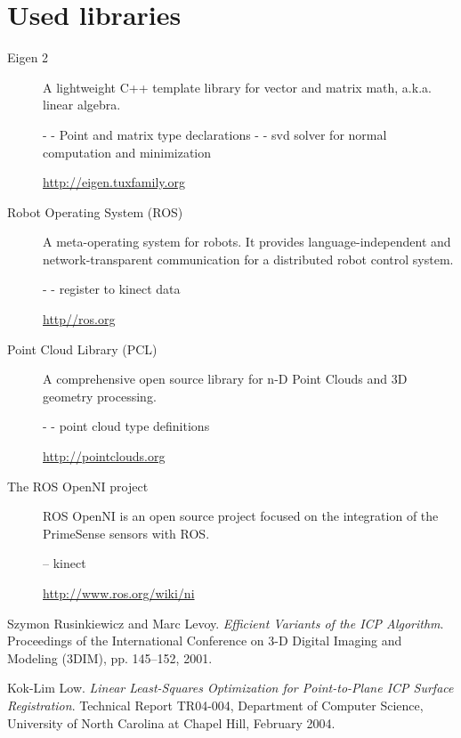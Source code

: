 \documentclass[twocolumn]{article}
\begin{document}
\section{Used libraries}
\begin{description}
\item[Eigen 2]
A lightweight C++ template library for vector and matrix math,
a.k.a. linear algebra.

- - Point and matrix type declarations
- - svd solver for normal computation and minimization

\href{http://eigen.tuxfamily.org}{http://eigen.tuxfamily.org}

\item[Robot Operating System (ROS)]
A meta-operating system for robots. It provides
language-independent and network-transparent communication for a
distributed robot control system.

- - register to kinect data

\href{http://ros.org}{http//ros.org}

\item[Point Cloud Library (PCL)]
A comprehensive open source library for n-D Point Clouds and 3D geometry processing.

- - point cloud type definitions

\href{http://pointclouds.org}{http://pointclouds.org}

\item[The ROS OpenNI project]
ROS OpenNI is an open source project focused on the integration of the PrimeSense sensors with ROS.

-- kinect

\href{http://www.ros.org/wiki/ni}{http://www.ros.org/wiki/ni}

\end{description}

\begin{thebibliography}{99}
Szymon Rusinkiewicz and Marc Levoy.
\emph{Efficient Variants of the ICP Algorithm}.
Proceedings of the International Conference on 3-D Digital Imaging and
Modeling (3DIM), pp. 145–152, 2001.

Kok-Lim Low.
\emph{Linear Least-Squares Optimization for
Point-to-Plane ICP Surface Registration}.
Technical Report TR04-004, Department of Computer Science, University of North Carolina at Chapel Hill, February 2004.

\end{thebibliography}
\end{document}
